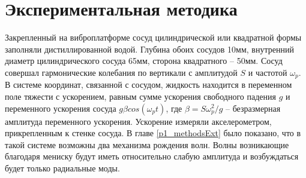 \section{Экспериментальная методика}\label{sect3_2}
Закрепленный на виброплатформе сосуд цилиндрической или квадратной формы заполняли дистиллированной водой. Глубина обоих сосудов 10мм, внутренний диаметр цилиндрического сосуда 65мм, сторона квадратного – 50мм. Сосуд совершал гармонические колебания по вертикали с амплитудой $S$ и частотой $\omega_p$. В системе координат, связанной с сосудом, жидкость находится в переменном поле тяжести с ускорением, равным сумме ускорения свободного падения $g$ и переменного ускорения сосуда $g \beta cos(\omega_p t)$, где $\beta = S \omega_p^2/g$ – безразмерная амплитуда переменного ускорения. Ускорение измеряли акселерометром, прикрепленным к стенке сосуда. В главе \ref{p1_methodsExt} было показано, что в такой системе возможны два механизма рождения волн. Волны возникающие благодаря мениску будут иметь относительно слабую амплитуда и возбуждаться будет только радиальные моды.


